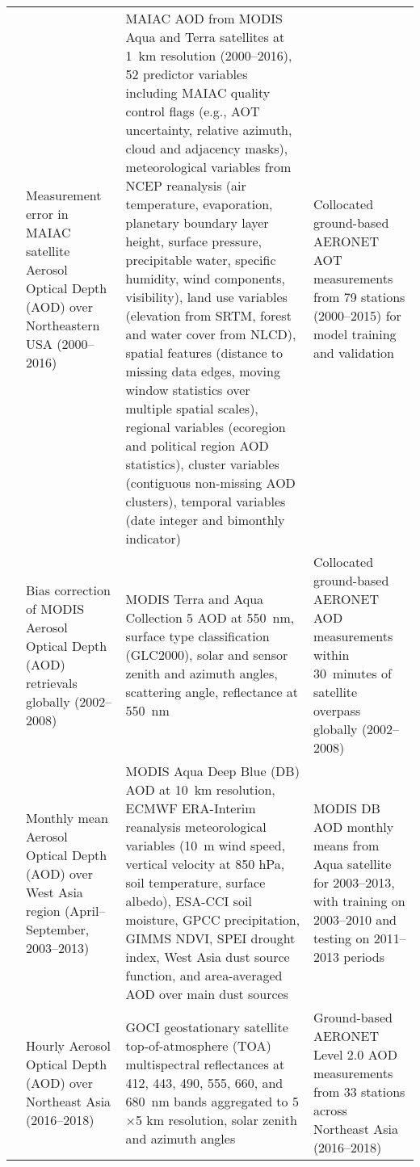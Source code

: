 \documentclass[11pt]{article}
\begin{document}
\begin{landscape}
\begin{longtable}{>{\raggedright\arraybackslash}p{2cm} 
        >{\raggedright\arraybackslash}p{4cm} 
        >{\raggedright\arraybackslash}p{10cm} 
        >{\raggedright\arraybackslash}p{6cm}}
\citet{just2018correcting} & Measurement error in MAIAC satellite Aerosol Optical Depth (AOD) over Northeastern USA (2000–2016) & 
MAIAC AOD from MODIS Aqua and Terra satellites at 1~km resolution (2000–2016), 52 predictor variables including MAIAC quality control flags (e.g., AOT uncertainty, relative azimuth, cloud and adjacency masks), meteorological variables from NCEP reanalysis (air temperature, evaporation, planetary boundary layer height, surface pressure, precipitable water, specific humidity, wind components, visibility), land use variables (elevation from SRTM, forest and water cover from NLCD), spatial features (distance to missing data edges, moving window statistics over multiple spatial scales), regional variables (ecoregion and political region AOD statistics), cluster variables (contiguous non-missing AOD clusters), temporal variables (date integer and bimonthly indicator) & 
Collocated ground-based AERONET AOT measurements from 79 stations (2000–2015) for model training and validation \\[6pt]

\citet{lary2009machine} & Bias correction of MODIS Aerosol Optical Depth (AOD) retrievals globally (2002–2008) & MODIS Terra and Aqua Collection 5 AOD at 550~nm, surface type classification (GLC2000), solar and sensor zenith and azimuth angles, scattering angle, reflectance at 550~nm & Collocated ground-based AERONET AOD measurements within 30~minutes of satellite overpass globally (2002–2008) \\[6pt]

\citet{nabavi2018prediction} & Monthly mean Aerosol Optical Depth (AOD) over West Asia region (April–September, 2003–2013) & MODIS Aqua Deep Blue (DB) AOD at 10~km resolution, ECMWF ERA-Interim reanalysis meteorological variables (10~m wind speed, vertical velocity at 850 hPa, soil temperature, surface albedo), ESA-CCI soil moisture, GPCC precipitation, GIMMS NDVI, SPEI drought index, West Asia dust source function, and area-averaged AOD over main dust sources & MODIS DB AOD monthly means from Aqua satellite for 2003–2013, with training on 2003–2010 and testing on 2011–2013 periods \\[6pt]

\citet{yeom2021estimation} & Hourly Aerosol Optical Depth (AOD) over Northeast Asia (2016–2018) & GOCI geostationary satellite top-of-atmosphere (TOA) multispectral reflectances at 412, 443, 490, 555, 660, and 680~nm bands aggregated to 5$\times$5 km resolution, solar zenith and azimuth angles & Ground-based AERONET Level 2.0 AOD measurements from 33 stations across Northeast Asia (2016–2018) \\[6pt]


\end{longtable}
\end{landscape}
\end{document}
